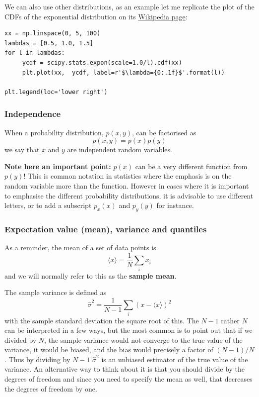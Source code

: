 \documentclass[a4paper,10pt]{article}
\newcommand{\link}[2]{{\color{blue}\href{#1}{#2}}}
\begin{document}
We can also use other distributions, as an example let me replicate the plot of the CDFs of the exponential distribution on its \link{https://en.wikipedia.org/wiki/Exponential_distribution}{Wikipedia page}:
\begin{lstlisting}
xx = np.linspace(0, 5, 100)   
lambdas = [0.5, 1.0, 1.5]
for l in lambdas:
     ycdf = scipy.stats.expon(scale=1.0/l).cdf(xx)
     plt.plot(xx,  ycdf, label=r'$\lambda={0:.1f}$'.format(l))
     
plt.legend(loc='lower right')
\end{lstlisting}



\subsubsection{ Independence}

When a probability distribution, $p(x, y)$, can be factorised as
$$p(x, y) = p(x) p(y)$$ we say that $x$ and $y$ are independent random variables.

\textbf{Note here an important point:} $p(x)$ can be a very different function from $p(y)$! This is common notation in statistics where the emphasis is on the random variable more than the function. However in cases where it is important to emphasise the different probability distributions, it is advisable to use different letters, or to add a subscript $p_x(x)$ and $p_y(y)$ for instance.

\subsubsection{ Expectation value (mean), variance and quantiles}

As a reminder, the mean of a set of data points is $$\langle x \rangle = \frac{1}{N} \sum_i x_i $$ and we will normally refer to this as the \textbf{sample mean}.

The sample variance is defined as
$$\hat{\sigma}^2 = \frac{1}{N-1} \sum_i \left(x-\langle x \rangle\right)^2$$
with the sample standard deviation the square root of this. The $N-1$ rather $N$ can be interpreted in a few ways, but the most common is to point out that if we divided by $N$, the sample variance would not converge to the true value of the variance, it would be biased, and the bias would precisely a factor of $(N-1)/N$. Thus by dividing by $N-1$  $\hat{\sigma}^2$ is an unbiased estimator of the true value of the variance. An alternative way to think about it is that you should divide by the degrees of freedom and since you need to specify the mean as well, that decreases the degrees of freedom by one.
\end{document}
